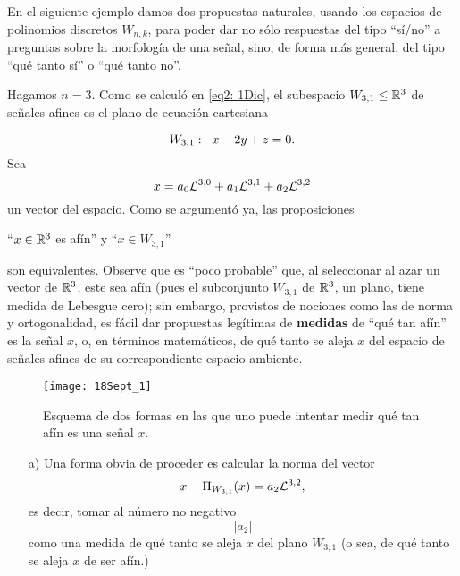 En el siguiente ejemplo 
damos dos propuestas naturales,
usando los espacios de polinomios discretos $W_{n,k}$,
para poder dar no sólo respuestas del tipo
``sí/no'' a preguntas sobre la morfología de una señal, sino,
de forma más general, del tipo ``qué tanto sí'' o
``qué tanto no''.





\begin{ej} \label{ej: donde muestro como cuantificamos la morfologia de una senal}
Hagamos $n=3$.  
Como se calculó en \eqref{eq2: 1Dic},
el subespacio $W_{3,1} \leq \mathbb{R}^{3}$ de señales afines es el plano
de ecuación cartesiana

\[
W_{3,1}: \hspace{0.2cm} x-2y+z=0.
\]
Sea 
\begin{equation*}
\label{eq0: 9Feb}
x=a_{0}\mathcal{L}^{3,0}+a_{1}\mathcal{L}^{3,1}+a_{2}\mathcal{L}^{3,2}
\end{equation*}
un vector del espacio.
Como se argumentó ya, las proposiciones
\begin{center}
``$x \in \mathbb{R}^{3}$ es afín'' \hspace{0.2cm} y \hspace{0.2cm} 
``$x \in W_{3,1}$''
\end{center} 
son equivalentes.
Observe que es ``poco probable'' que, al seleccionar al azar
un vector de $\mathbb{R}^{3}$, este sea afín (pues el 
subconjunto $W_{3,1}$ de $\mathbb{R}^{3}$,
un plano, tiene
medida de Lebesgue cero); sin embargo, provistos
de nociones como las de norma y ortogonalidad, es fácil dar 
propuestas legítimas de
\textbf{medidas} de ``qué tan afín'' es la señal $x$,
o, en términos matemáticos, de qué tanto se aleja
$x$ del espacio de señales afines de su correspondiente
espacio ambiente.


\begin{figure}[H]
\centering\captionsetup{format = hang}
	\begin{measuredfigure}
		\texttt{[image: 18Sept\_1]} 
		\caption{Esquema de dos formas en las que uno puede intentar medir
	qué tan afín es una señal $x$. }
 	\end{measuredfigure}
 \end{figure}


\begin{itemize}
\item[a)] Una forma obvia de proceder es calcular la norma
del vector 
\[
x - \Pi_{W_{3,1}}(x)= a_{2} \mathcal{L}^{3,2},
\]
es decir, tomar al número no negativo
\[
|a_{2}|
\]
como una medida de qué tanto se aleja $x$ del plano $W_{3,1}$
(o sea, de qué tanto se aleja $x$ de ser afín.)


\end{itemize}
\end{ej}
